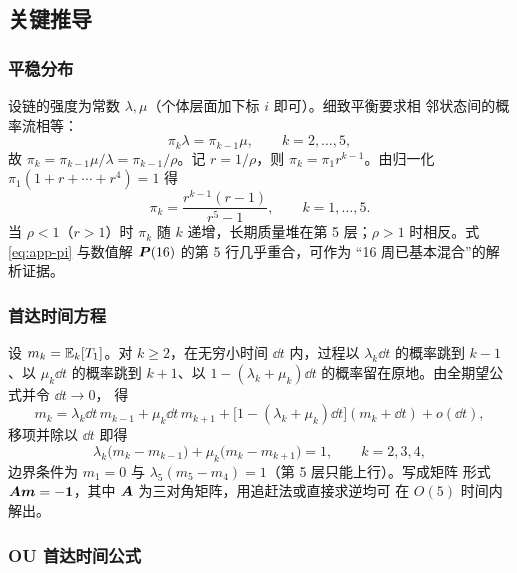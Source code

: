 \subsection{关键推导}

\subsubsection{平稳分布}

设链的强度为常数 $\lambda,\mu$（个体层面加下标 $i$ 即可）。细致平衡要求相
邻状态间的概率流相等：
\begin{equation}
\pi_{k}\lambda=\pi_{k-1}\mu,\qquad k=2,\dots,5,
\label{eq:app-balance}
\end{equation}
故 $\pi_k=\pi_{k-1}\mu/\lambda=\pi_{k-1}/\rho$。记 $r=1/\rho$，则
$\pi_k=\pi_1 r^{k-1}$。由归一化
$\pi_1(1+r+\cdots+r^4)=1$ 得
\begin{equation}
\pi_k=\frac{r^{k-1}(r-1)}{r^{5}-1},\qquad k=1,\dots,5 .
\label{eq:app-pi}
\end{equation}
当 $\rho<1$（$r>1$）时 $\pi_k$ 随 $k$ 递增，长期质量堆在第 5 层；$\rho>1$
时相反。式\eqref{eq:app-pi} 与数值解 $\bm{P}(16)$ 的第 5 行几乎重合，可作为
“16 周已基本混合”的解析证据。

\subsubsection{首达时间方程}

设 $m_k=\mathbb{E}_k[T_1]$。对 $k\ge2$，在无穷小时间 $\dd t$ 内，过程以
$\lambda_k\dd t$ 的概率跳到 $k-1$、以 $\mu_k\dd t$ 的概率跳到 $k+1$、以
$1-(\lambda_k+\mu_k)\dd t$ 的概率留在原地。由全期望公式并令 $\dd t\to0$，
得
\begin{equation}
m_k=\lambda_k\dd t\,m_{k-1}+\mu_k\dd t\,m_{k+1}
+\bigl[1-(\lambda_k+\mu_k)\dd t\bigr](m_k+\dd t)+o(\dd t),
\end{equation}
移项并除以 $\dd t$ 即得
\begin{equation}
\lambda_k\bigl(m_k-m_{k-1}\bigr)+\mu_k\bigl(m_k-m_{k+1}\bigr)=1,
\qquad k=2,3,4,
\label{eq:app-hit}
\end{equation}
边界条件为 $m_1=0$ 与 $\lambda_5(m_5-m_4)=1$（第 5 层只能上行）。写成矩阵
形式 $\bm{A}\bm{m}=-\bm{1}$，其中 $\bm{A}$ 为三对角矩阵，用追赶法或直接求逆均可
在 $O(5)$ 时间内解出。

\subsubsection{OU 首达时间公式}

